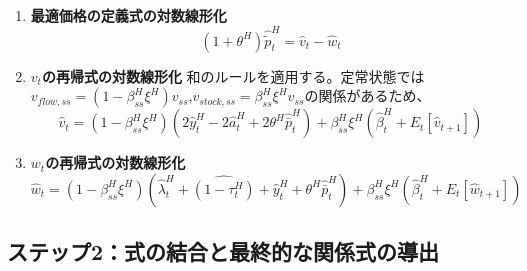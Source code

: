 \begin{enumerate}
    \item\label{itm:appendix_optimal_price_derivation_opt_p_loglin_p} \textbf{最適価格の定義式の対数線形化}
    \begin{equation}
    (1+\theta^H)\hat{\widetilde{p}}_t^H=\hat{v}_t-\hat{w}_t
    \label{eq:appendix_optimal_price_derivation_optimal_price_loglin_sub1_p}
    \end{equation}

    \item\label{itm:appendix_optimal_price_derivation_opt_p_loglin_v} \textbf{\(v_t\)の再帰式の対数線形化}
    和のルールを適用する。定常状態では\(v_{flow,ss}=(1-\beta_{ss}^H\xi^H)v_{ss}\),\(v_{stock,ss}=\beta_{ss}^H\xi^Hv_{ss}\)の関係があるため、
    \begin{equation}
    \hat{v}_t=(1-\beta_{ss}^H\xi^H)(2\hat{y}_t^H-2\hat{a}_t^H+2\theta^H\hat{\bar{p}}_t^H)+\beta_{ss}^H\xi^H(\hat{\beta}_t^H+E_t[\hat{v}_{t+1}])
    \label{eq:appendix_optimal_price_derivation_optimal_price_loglin_sub1_v}
    \end{equation}

    \item\label{itm:appendix_optimal_price_derivation_opt_p_loglin_w} \textbf{\(w_t\)の再帰式の対数線形化}
    \begin{equation}
    \hat{w}_t=(1-\beta_{ss}^H\xi^H)(\hat{\lambda}_t^H+\widehat{(1-\tau_t^H)}+\hat{y}_t^H+\theta^H\hat{\bar{p}}_t^H)+\beta_{ss}^H\xi^H(\hat{\beta}_t^H+E_t[\hat{w}_{t+1}])
    \label{eq:appendix_optimal_price_derivation_optimal_price_loglin_sub1_w}
    \end{equation}
\end{enumerate}

\subsection*{ステップ2：式の結合と最終的な関係式の導出}
\label{sec:appendix_optimal_price_derivation_optimal_price_loglin_sub2}

